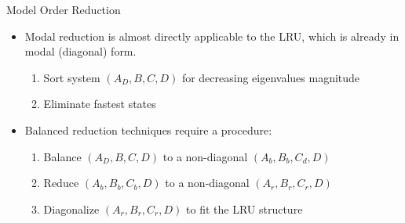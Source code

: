 \documentclass{beamer}
\begin{document}
\begin{frame}{Model Order Reduction}
\begin{itemize}
\item Modal reduction is almost directly applicable to the LRU, which is already in modal (diagonal) form.
\begin{enumerate}
\item Sort system $(A_D, B, C, D)$ for decreasing eigenvalues magnitude
\item Eliminate fastest states
\end{enumerate}
\item Balanced reduction techniques require a  procedure:
\begin{enumerate}
\item Balance $(A_D, B, C, D)$ to a non-diagonal $(A_b, B_b, C_d, D)$
\item Reduce $(A_b, B_b, C_b, D)$ to a non-diagonal $(A_r, B_r, C_r, D)$
\item Diagonalize $(A_r, B_r, C_r, D)$ to fit the LRU structure
\end{enumerate}
\end{itemize}
\end{frame}
\end{document}
